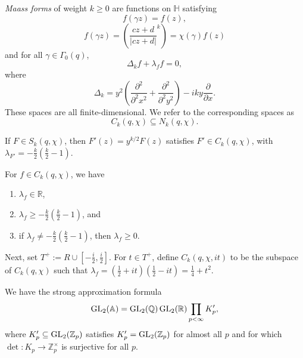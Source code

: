 \documentclass[reqno]{amsart} 
\begin{document}
\emph{Maass forms}  of weight $k \geq 0$ are functions on $\mathbb{H}$ satisfying
\begin{equation*}
  f(\gamma z) =  f(z) ,
\end{equation*}
\begin{equation*}
  f(\gamma z) = \left( \frac{c z + d}{\lvert c z + d \rvert}^k \right)
  = \chi(\gamma) f(z)
\end{equation*}
and for all $\gamma \in \Gamma_0(q)$,
\begin{equation*}
  \Delta_k f + \lambda_f f = 0,
\end{equation*}
where
\begin{equation*}
  \Delta_k = y^2 \left( \frac{\partial^2}{\partial^2 x^2} + \frac{\partial^2}{\partial^2 y^2} \right)
  - i k y \frac{\partial}{ \partial x}.
\end{equation*}
These spaces are all finite-dimensional.  We refer to the corresponding spaces as
\begin{equation*}
  C_k(q, \chi) \subseteq N_k(q, \chi).
\end{equation*}

If $F \in S_k(q, \chi)$, then $F '(z) = y^{k/2} F(z)$ satisfies $F' \in C_k(q, \chi)$, with $\lambda_{F '} = - \tfrac{k}{2}(\tfrac{k}{2} - 1)$.

For $f \in C_k(q, \chi)$, we have
\begin{enumerate}
\item $\lambda_f \in \mathbb{R}$,
\item $\lambda_f \geq -
  \tfrac{k}{2}(\tfrac{k}{2} - 1)$, and
\item if $\lambda_f \neq - \tfrac{k}{2}(\tfrac{k}{2} - 1)$, then $\lambda_f \geq 0$.
\end{enumerate}
Next, set $T^+ := R \cup \left[ - \tfrac{i}{2}, \tfrac{i}{2}\right]$.  For $t \in T^+$, define $C_k(q, \chi, i t)$ to be the subspace of $C_k(q, \chi)$ such that $\lambda_f = (\tfrac{1}{2} + i t)(\tfrac{1}{2} - i t) = \tfrac{1}{4} + t^2$.

We have the strong approximation formula
\begin{equation}\label{eq:cnog03qd0j}
  \operatorname{GL}_2(\mathbb{A}) = \operatorname{GL}_2(\mathbb{Q}) \operatorname{GL}_2(\mathbb{R})
  \prod_{p < \infty} K_p ',
\end{equation}
where $K_p ' \subseteq \operatorname{GL}_2(\mathbb{Z}_p)$ satisfies $K_p ' = \operatorname{GL}_2(\mathbb{Z}_p)$ for almost all $p$ and for which $\det : K_p \rightarrow \mathbb{Z}_p^\times$ is surjective for all $p$.
\end{document}

